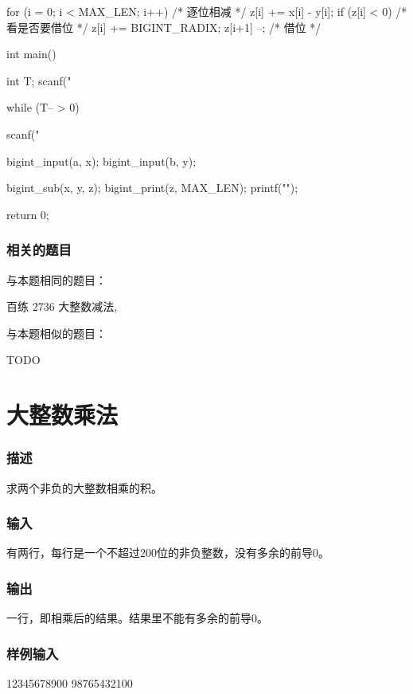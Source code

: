 \begin{Codex}[label=bigint_sub.c]
{    for (i = 0; i < MAX_LEN; i++) {  /* 逐位相减 */
        z[i] += x[i] - y[i];
        if (z[i] < 0) {  /* 看是否要借位 */
            z[i] += BIGINT_RADIX;
            z[i+1] --;  /* 借位 */
        }
    }
}

int main() {
    int T;    
    scanf("%

    while (T-- > 0) {
        scanf("%

        bigint_input(a, x);
        bigint_input(b, y);

        bigint_sub(x, y, z);
        bigint_print(z, MAX_LEN);
        printf("\n"); 
    }
    return 0;
}
\end{Codex}

\subsubsection{相关的题目}
与本题相同的题目：
\begindot
\item 百练 2736 大整数减法, 
\myenddot

与本题相似的题目：
\begindot
\item  TODO
\myenddot


\section{大整数乘法} %
\label{sec:bigintmul}
\subsubsection{描述}
求两个非负的大整数相乘的积。

\subsubsection{输入}
有两行，每行是一个不超过200位的非负整数，没有多余的前导0。 

\subsubsection{输出}
一行，即相乘后的结果。结果里不能有多余的前导0。 

\subsubsection{样例输入}
\begin{Code}
12345678900
98765432100
\end{Code}

